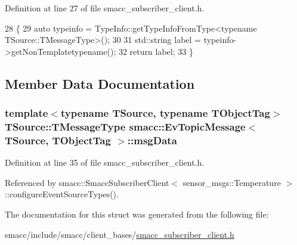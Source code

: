 Definition at line 27 of file smacc\+\_\+subscriber\+\_\+client.\+h.


\begin{DoxyCode}
28   \{
29     \textcolor{keyword}{auto} typeinfo = TypeInfo::getTypeInfoFromType<typename TSource::TMessageType>();
30 
31     std::string label = typeinfo->getNonTemplatetypename();
32     \textcolor{keywordflow}{return} label;
33   \}
\end{DoxyCode}


\subsection{Member Data Documentation}
\subsubsection[{\texorpdfstring{msg\+Data}{msgData}}]{\setlength{\rightskip}{0pt plus 5cm}template$<$typename T\+Source, typename T\+Object\+Tag$>$ T\+Source\+::\+T\+Message\+Type {\bf smacc\+::\+Ev\+Topic\+Message}$<$ T\+Source, T\+Object\+Tag $>$\+::msg\+Data}\hypertarget{structsmacc_1_1EvTopicMessage_adc167f5114cc3c4ff06ea9c810cc280f}{}\label{structsmacc_1_1EvTopicMessage_adc167f5114cc3c4ff06ea9c810cc280f}


Definition at line 35 of file smacc\+\_\+subscriber\+\_\+client.\+h.



Referenced by smacc\+::\+Smacc\+Subscriber\+Client$<$ sensor\+\_\+msgs\+::\+Temperature $>$\+::configure\+Event\+Source\+Types().



The documentation for this struct was generated from the following file\+:\begin{DoxyCompactItemize}
\item 
smacc/include/smacc/client\+\_\+bases/\hyperlink{smacc__subscriber__client_8h}{smacc\+\_\+subscriber\+\_\+client.\+h}\end{DoxyCompactItemize}
